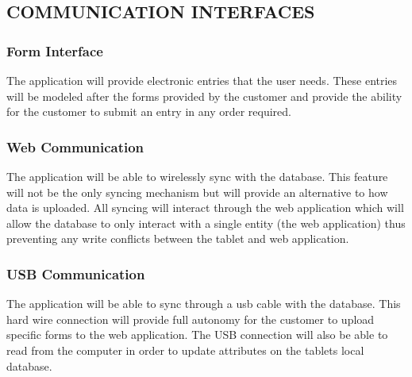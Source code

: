 \documentclass[twoside,letterpaper]{article}
\begin{document}
\subsection[COMMUNICATION INTERFACES]{\rmfamily\bfseries\color{black}
COMMUNICATION INTERFACES}
{\rmfamily\color{black}

\subsubsection{Form Interface}
The application will provide electronic entries that the user needs. These entries will be modeled after the forms provided by the customer and provide the ability for the customer to submit an entry in any order required.

\subsubsection{Web Communication}
The application will be able to wirelessly sync with the database. This feature will not be the only syncing mechanism but will provide an alternative to how data is uploaded. All syncing will interact through the web application which will allow the database to only interact with a single entity (the web application) thus preventing any write conflicts between the tablet and web application.

\subsubsection{USB Communication}
The application will be able to sync through a usb cable with the database. This hard wire connection will provide full autonomy for the customer to upload specific forms to the web application. The USB connection will also be able to read from the computer in order to update attributes on the tablets local database.}
\end{document}
